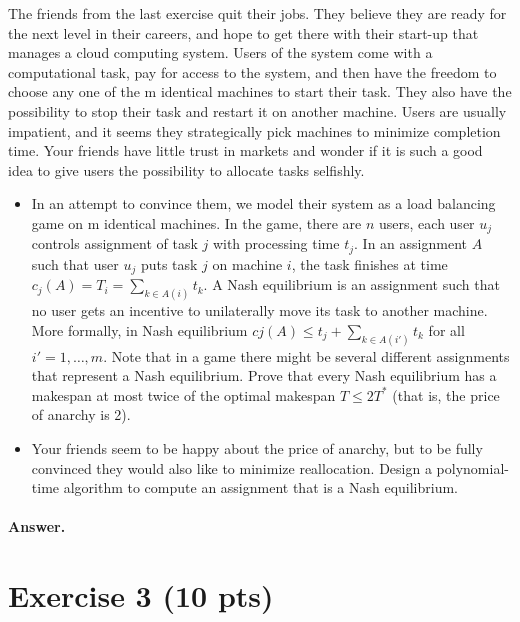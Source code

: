 \documentclass[a4paper]{article}
\begin{document}
The friends from the last exercise quit their jobs. They believe they are ready for the next level in their careers, and hope to get there with their start-up that manages a cloud computing system. Users of the system come with a computational task, pay for access to the system, and then have the freedom to choose any one of the m identical machines to start their task. They also have the possibility to stop their task and restart it on another machine. Users are usually impatient, and it seems they strategically pick machines to minimize completion time. Your friends have little trust in markets and wonder if it is such a good idea to give users the possibility to allocate tasks selfishly.
\begin{itemize}
	\item In an attempt to convince them, we model their system as a load balancing game on m identical machines. In the game, there are $n$ users, each user $u_j$ controls assignment of task $j$ with processing time $t_j$. In an assignment $A$ such that user $u_j$ puts task $j$ on machine $i$, the task finishes at time $c_j(A) = T_i = \sum_{k \in A(i)} t_k$. A Nash equilibrium is an assignment such that no user gets an incentive to unilaterally move its task to another machine. More formally, in Nash equilibrium $cj(A) \le t_j + \sum_{k \in A(i′)} t_k$ for all $i′ = 1,\ldots,m$. Note that in a game there might be several different assignments that represent a Nash equilibrium. Prove that every Nash equilibrium has a makespan at most twice of the optimal makespan $T \le 2T^\ast$ (that is, the price of anarchy is 2).
	\item Your friends seem to be happy about the price of anarchy, but to be fully convinced they would also like to minimize reallocation. Design a polynomial-time algorithm to compute an assignment that is a Nash equilibrium.

\end{itemize}

\paragraph{Answer.}

\section*{Exercise 3 (10 pts)}
\end{document}
